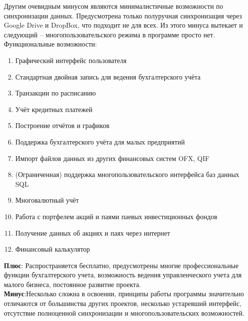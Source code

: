 Другим очевидным минусом являются минималистичные возможности по синхронизации данных. Предусмотрена только полуручная синхронизация через Google Drive и DropBox, что подходит не для всех. Из этого минуса вытекает и следующий – многопользовательского режима в программе просто нет.\\
Функциональные возможности:\\
\begin{enumerate}
	\item Графический интерфейс пользователя
	\item Стандартная двойная запись для ведения бухгалтерского учёта
	\item Транзакции по расписанию
	\item Учёт кредитных платежей
	\item Построение отчётов и графиков
	\item Поддержка бухгалтерского учёта для малых предприятий
	\item Импорт файлов данных из других финансовых систем OFX, QIF
	\item (Ограниченная) поддержка многопользовательского интерфейса баз данных SQL
	\item Многовалютный учёт
	\item Работа с портфелем акций и паями паевых инвестиционных фондов
	\item Получение данных об акциях и паях через интернет
	\item Финансовый калькулятор
\end{enumerate}
\textbf{Плюс}: Распространяется бесплатно, предусмотрены многие профессиональные функции бухгалтерского учета, возможность ведения управленческого учета для малого бизнеса, постоянное развитие проекта.\\
\textbf{Минус}:Несколько сложна в освоении, принципы работы программы значительно отличаются от большинства других проектов, несколько устаревший интерфейс, отсутствие полноценной синхронизации и многопользовательских возможностей.\\
\pagebreak

